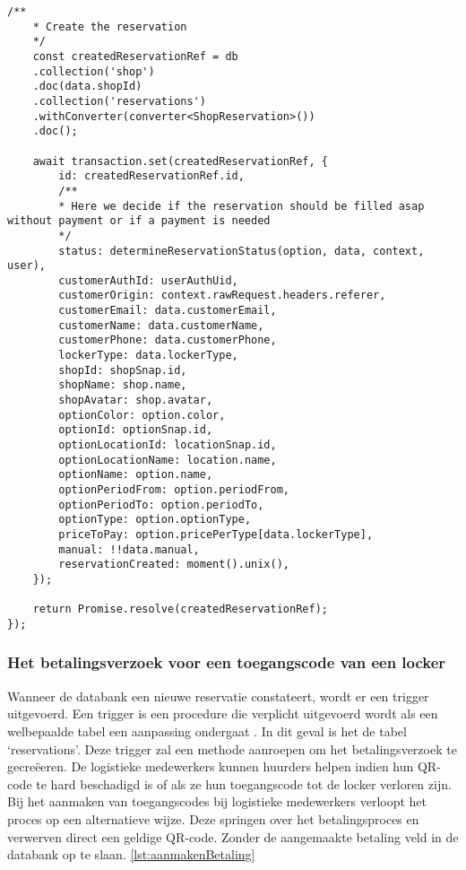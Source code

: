 \begin{lstlisting}[caption={De creatie van een reservatie voor het huren van een locker. Deze reservatie wordt bijgehouden in de databank}, label={lst:aanmakenReservatie}]
    /**
    * Create the reservation
    */
    const createdReservationRef = db
    .collection('shop')
    .doc(data.shopId)
    .collection('reservations')
    .withConverter(converter<ShopReservation>())
    .doc();
    
    await transaction.set(createdReservationRef, {
        id: createdReservationRef.id,
        /**
        * Here we decide if the reservation should be filled asap without payment or if a payment is needed
        */
        status: determineReservationStatus(option, data, context, user),
        customerAuthId: userAuthUid,
        customerOrigin: context.rawRequest.headers.referer,
        customerEmail: data.customerEmail,
        customerName: data.customerName,
        customerPhone: data.customerPhone,
        lockerType: data.lockerType,
        shopId: shopSnap.id,
        shopName: shop.name,
        shopAvatar: shop.avatar,
        optionColor: option.color,
        optionId: optionSnap.id,
        optionLocationId: locationSnap.id,
        optionLocationName: location.name,
        optionName: option.name,
        optionPeriodFrom: option.periodFrom,
        optionPeriodTo: option.periodTo,
        optionType: option.optionType,
        priceToPay: option.pricePerType[data.lockerType],
        manual: !!data.manual,
        reservationCreated: moment().unix(),
    });
    
    return Promise.resolve(createdReservationRef);
});
\end{lstlisting}

\subsubsection{Het betalingsverzoek voor een toegangscode van een locker}%
\label{sec:opbouwQR-codeVerkoop12}

Wanneer de databank een nieuwe reservatie constateert, wordt er een trigger uitgevoerd. Een trigger is een procedure die verplicht uitgevoerd wordt als een welbepaalde tabel een aanpassing ondergaat \autocite{documentation}. In dit geval is het de tabel ‘reservations’. Deze trigger zal een methode aanroepen om het betalingsverzoek te gecreëeren. 
De logistieke medewerkers kunnen huurders helpen indien hun QR-code te hard beschadigd is of als ze hun toegangscode tot de locker verloren zijn. Bij het aanmaken van toegangscodes bij logistieke medewerkers verloopt het proces op een alternatieve wijze.  Deze springen over het betalingsproces en verwerven direct een geldige QR-code. Zonder de aangemaakte betaling veld in de databank op te slaan.  \ref{lst:aanmakenBetaling}

